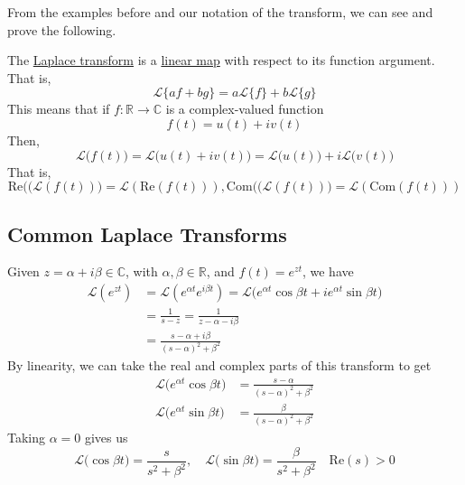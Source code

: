 \documentclass{article}
\newcounter{theorem}[section]
\newcounter{example}[section]
\begin{document}
  From the examples before and our notation of the transform, we can see and prove the following. 

  \begin{theorem}
    \label{thm:linearity-of-the-laplace-transform}
  The \hyperref[def:laplace-transform]{Laplace transform} is a \hyperref[lin-def:linear_map]{linear map} with respect to its function argument. That is, 
  \begin{equation}
    \mathcal{L} \{a f + b g\} = a \mathcal{L}\{f\} + b \mathcal{L}\{g\}
  \end{equation}
  This means that if $f: \mathbb{R} \to \mathbb{C}$ is a complex-valued function
  \begin{equation}
    f(t) = u(t) + i v(t)
  \end{equation}
  Then, 
  \begin{equation}
    \mathcal{L}\big(f(t)\big) = \mathcal{L}\big(u(t) + i v(t) \big) = \mathcal{L} \big( u(t) \big) + i \mathcal{L} \big( v(t)\big)
  \end{equation}
  That is, 
  \begin{equation}
    \text{Re}\big((\mathcal{L}(f(t))\big) = \mathcal{L}( \text{Re}(f(t))), \text{Com}\big((\mathcal{L}(f(t))\big) = \mathcal{L}( \text{Com}(f(t)))
  \end{equation}
  \end{theorem}


  \subsection{Common Laplace Transforms}

    \begin{example}
      \label{ex:laplace-transform-of-a-complex-exponential}
    Given $z = \alpha + i \beta \in \mathbb{C}$, with $\alpha, \beta \in \mathbb{R}$, and $f(t) = e^{zt}$, we have
    \begin{align*}
        \mathcal{L} (e^{zt}) & = \mathcal{L} (e^{\alpha t} e^{i \beta t}) = \mathcal{L} \big( e^{\alpha t} \cos{\beta t} + i e^{\alpha t} \sin{\beta t}\big) \\
        & = \frac{1}{s-z} = \frac{1}{z - \alpha - i \beta} \\
        & = \frac{s - \alpha + i \beta}{(s-\alpha)^2 + \beta^2}
    \end{align*}
    By linearity, we can take the real and complex parts of this transform to get
    \begin{align}
        \mathcal{L} \big(e^{\alpha t} \cos{\beta t} \big) & = \frac{s-\alpha}{(s-\alpha)^2 + \beta^2} \\
        \mathcal{L} \big(e^{\alpha t} \sin{\beta t} \big) & = \frac{\beta}{(s-\alpha)^2 + \beta^2}
    \end{align}
    Taking $\alpha = 0$ gives us
    \begin{equation}
      \mathcal{L} \big( \cos{\beta t}\big) = \frac{s}{s^2 + \beta^2}, \quad \mathcal{L}\big( \sin{\beta t}\big) = \frac{\beta}{s^2 + \beta^2} \quad \text{Re}(s) > 0
    \end{equation}
    \end{example}
\end{document}
